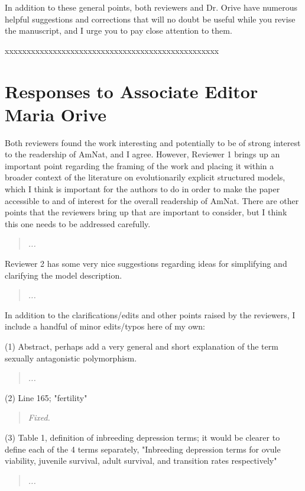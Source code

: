 \documentclass[11pt]{article}
\begin{document}
In addition to these general points, both reviewers and Dr. Orive have numerous helpful suggestions and corrections that will no doubt be useful while you revise the manuscript, and I urge you to pay close attention to them.
\bigskip


\noindent xxxxxxxxxxxxxxxxxxxxxxxxxxxxxxxxxxxxxxxxxxxxxxxxx

\section*{Responses to Associate Editor Maria Orive}

Both reviewers found the work interesting and potentially to be of strong interest to the readership of AmNat, and I agree. However, Reviewer 1 brings up an important point regarding the framing of the work and placing it within a broader context of the literature on evolutionarily explicit structured models, which I think is important for the authors to do in order to make the paper accessible to and of interest for the overall readership of AmNat. There are other points that the reviewers bring up that are important to consider, but I think this one needs to be addressed carefully.

\begin{quote}
	{\itshape ...}
\end{quote}


Reviewer 2 has some very nice suggestions regarding ideas for simplifying and clarifying the model description.

\begin{quote}
	{\itshape ...}
\end{quote}

In addition to the clarifications/edits and other points raised by the reviewers, I include a handful of minor edits/typos here of my own:

\noindent (1) Abstract, perhaps add a very general and short explanation of the term sexually antagonistic polymorphism.
\begin{quote}
	{\itshape ...}
\end{quote}

\noindent (2) Line 165; "fertility"
\begin{quote}
	{\itshape Fixed.}
\end{quote}

\noindent (3) Table 1, definition of inbreeding depression terms; it would be clearer to define each of the 4 terms separately, "Inbreeding depression terms for ovule viability, juvenile survival, adult survival, and transition rates respectively"
\begin{quote}
	{\itshape ...}
\end{quote}
\end{document}
